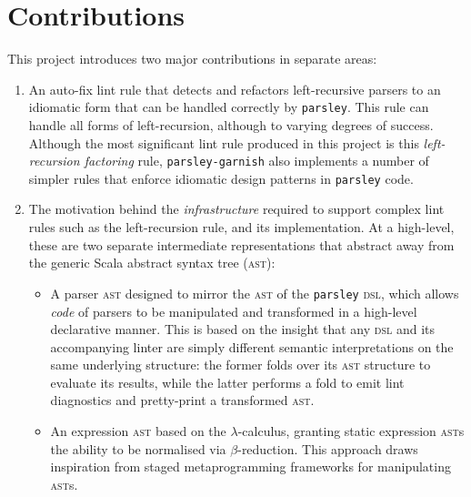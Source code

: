 \documentclass[../../main.tex]{subfiles}
\begin{document}

\section*{Contributions}
This project introduces two major contributions in separate areas:
\begin{enumerate}
  \item An auto-fix lint rule that detects and refactors left-recursive parsers to an idiomatic form that can be handled correctly by \texttt{parsley}. This rule can handle all forms of left-recursion, although to varying degrees of success. Although the most significant lint rule produced in this project is this \emph{left-recursion factoring} rule, \texttt{parsley-garnish} also implements a number of simpler rules that enforce idiomatic design patterns in \texttt{parsley} code.
  \item The motivation behind the \emph{infrastructure} required to support complex lint rules such as the left-recursion rule, and its implementation. At a high-level, these are two separate intermediate representations that abstract away from the generic Scala abstract syntax tree (\textsc{ast}):
  \begin{itemize}
    \item A parser \textsc{ast} designed to mirror the \textsc{ast} of the \texttt{parsley} \textsc{dsl}, which allows \emph{code} of parsers to be manipulated and transformed in a high-level declarative manner. This is based on the insight that any \textsc{dsl} and its accompanying linter are simply different semantic interpretations on the same underlying structure: the former folds over its \textsc{ast} structure to evaluate its results, while the latter performs a fold to emit lint diagnostics and pretty-print a transformed \textsc{ast}.
    \item An expression \textsc{ast} based on the $\lambda$-calculus, granting static expression \textsc{ast}s the ability to be normalised via $\beta$-reduction. This approach draws inspiration from staged metaprogramming frameworks for manipulating \textsc{ast}s.
  \end{itemize}
\end{enumerate}
\end{document}
